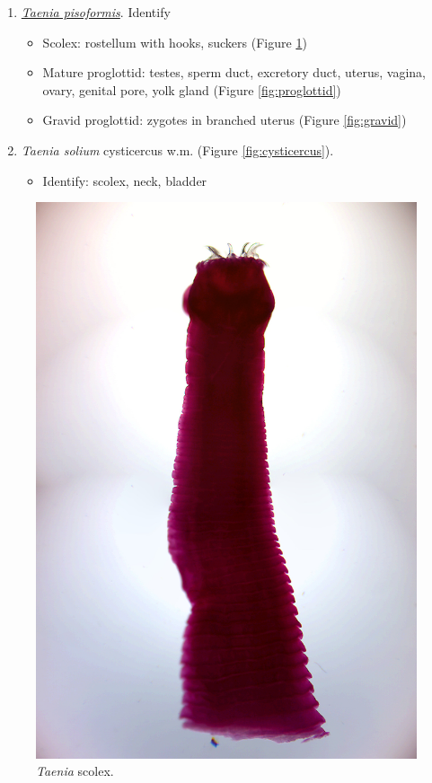 \begin{enumerate}
\def\labelenumi{\arabic{enumi}.}
\tightlist
\item
  \href{https://en.wikipedia.org/wiki/Taenia_pisiformis}{\emph{Taenia
  pisoformis}}. Identify

  \begin{itemize}
  \tightlist
  \item
    Scolex: rostellum with hooks, suckers (Figure \ref{fig:scolex})
  \item
    Mature proglottid: testes, sperm duct, excretory duct, uterus,
    vagina, ovary, genital pore, yolk gland (Figure
    \ref{fig:proglottid})
  \item
    Gravid proglottid: zygotes in branched uterus (Figure
    \ref{fig:gravid})
  \end{itemize}
\item
  \emph{Taenia solium} cysticercus w.m. (Figure \ref{fig:cysticercus}).

  \begin{itemize}
  \tightlist
  \item
    Identify: scolex, neck, bladder
  \end{itemize}
\end{enumerate}

\begin{figure}

{\centering \includegraphics[width=0.7\linewidth]{./figures/rotifera/taenia_scolex}

}

\caption{\emph{Taenia} scolex.}\label{fig:scolex}
\end{figure}

